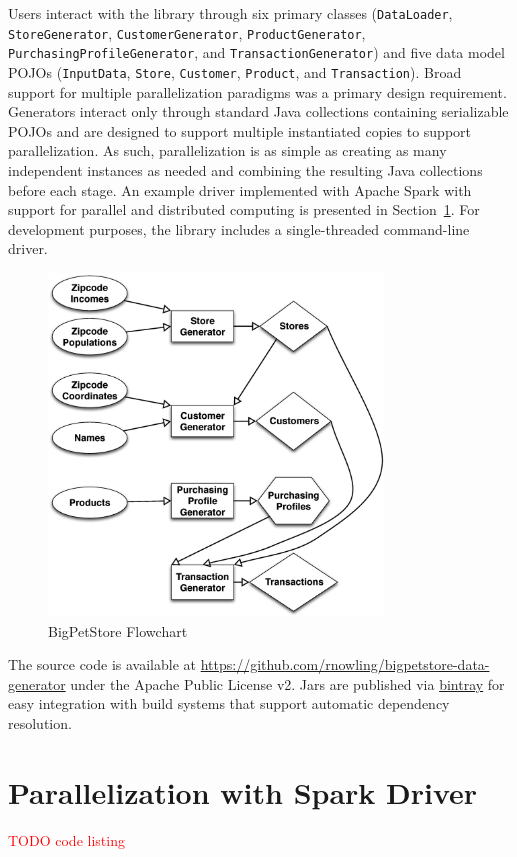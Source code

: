 \documentclass[conference]{IEEEtran}
\begin{document}
Users interact with the library through six primary classes (\texttt{DataLoader}, \texttt{StoreGenerator}, \texttt{CustomerGenerator}, \texttt{ProductGenerator}, \texttt{PurchasingProfileGenerator}, and \texttt{TransactionGenerator}) and five data model POJOs (\texttt{InputData}, \texttt{Store}, \texttt{Customer}, \texttt{Product}, and \texttt{Transaction}).  Broad support for multiple parallelization paradigms was a primary design requirement.  Generators interact only through standard Java collections containing serializable POJOs and are designed to support multiple instantiated copies to support parallelization.  As such, parallelization is as simple as creating as many independent instances as needed and combining the resulting Java collections before each stage. An example driver implemented with Apache Spark with support for parallel and distributed computing is presented in Section~\ref{sec:spark}.  For development purposes, the library includes a single-threaded command-line driver.

\begin{figure}[!t]
  \centering
  \includegraphics[width=3.5in]{figures/bps_flowchart.eps}
  \caption{BigPetStore Flowchart}
  \label{fig:bps_flowchart}
\end{figure}

The source code is available at \url{https://github.com/rnowling/bigpetstore-data-generator} under the Apache Public License v2. Jars are published via \textcolor{red}{\url{bintray}} for easy integration with build systems that support automatic dependency resolution.  

\section{Parallelization with Spark Driver} \label{sec:spark}
\textcolor{red}{TODO code listing}
\end{document}
